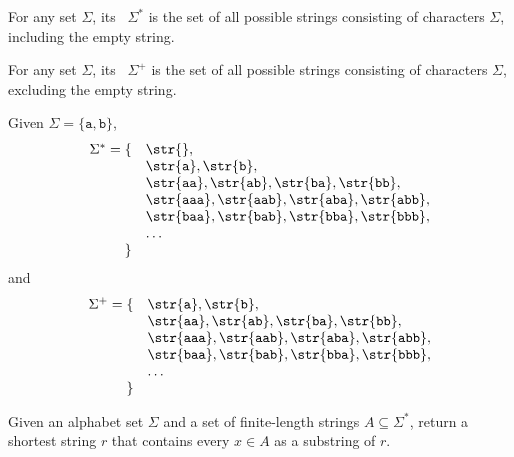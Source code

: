 \begin{flex}
\begin{definition}
For any set $\Sigma$, its~ $\Sigma^*$ is the set of
all possible strings consisting of characters $\Sigma$, including the
empty string.

For any set $\Sigma$, its~ $\Sigma^+$ is the set of
all possible strings consisting of characters $\Sigma$, excluding the
empty string.
\end{definition}

\begin{example}
Given $\Sigma = \{\texttt{a},\texttt{b}\}$,
\[
\begin{array}{rl}
\Sigma^* 
%
= 
%
\{
&
\str{}, 
%
\\
&
\str{\texttt{a}}, \str{\texttt{b}}, 
%
\\
&
\str{\texttt{aa}}, \str{\texttt{ab}}, 
\str{\texttt{ba}}, \str{\texttt{bb}}, 
\\
%
&
\str{\texttt{aaa}}, \str{\texttt{aab}}, \str{\texttt{aba}},
\str{\texttt{abb}},
\\
& \str{\texttt{baa}}, \str{\texttt{bab}}, \str{\texttt{bba}}, \str{\texttt{bbb}},
\\
%
&
\ldots
\\
\} &
\end{array}
\]
%
and
%
\[
\begin{array}{rl}
\Sigma^+
%
= 
%
\{
&
\str{\texttt{a}}, \str{\texttt{b}}, 
\\
%
&
\str{\texttt{aa}}, \str{\texttt{ab}}, 
\str{\texttt{ba}}, \str{\texttt{bb}}, 
\\
%
&
\str{\texttt{aaa}}, \str{\texttt{aab}}, \str{\texttt{aba}}, \str{\texttt{abb}}, 
\\
&
\str{\texttt{baa}}, \str{\texttt{bab}}, \str{\texttt{bba}}, 
\str{\texttt{bbb}},
\\
%
& \ldots
\\
\} & 
\\
\end{array}
\]
\end{example}
\end{flex}

\begin{definition}
  Given an alphabet set $\Sigma$ and a set of finite-length strings
  $A \subseteq \Sigma^*$, return a shortest string $r$ that contains every $x
  \in A$ as a substring of $r$.

\end{definition}

